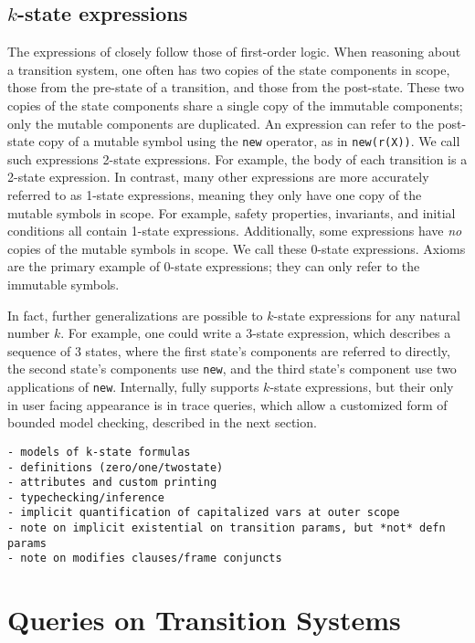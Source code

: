\subsection{$k$-state expressions}

The expressions of \mypyvy closely follow those of first-order logic.
When reasoning about a transition system,
  one often has two copies of the state components in scope,
  those from the pre-state of a transition, and those from the post-state.
These two copies of the state components share a single copy of the immutable components;
  only the mutable components are duplicated.
An expression can refer to the post-state copy of a mutable symbol
  using the \lstinline[language=mypyvy]{new} operator,
  as in \lstinline[language=mypyvy]{new(r(X))}.
We call such expressions 2-state expressions.
For example, the body of each transition is a 2-state expression.
In contrast, many other expressions are
  more accurately referred to as 1-state expressions,
  meaning they only have one copy of the mutable symbols in scope.
For example, safety properties, invariants,
  and initial conditions all contain 1-state expressions.
Additionally, some expressions have \emph{no} copies of the mutable symbols in scope.
We call these 0-state expressions.
Axioms are the primary example of 0-state expressions;
  they can only refer to the immutable symbols.

In fact, further generalizations are possible
  to $k$-state expressions for any natural number $k$.
For example, one could write a 3-state expression,
  which describes a sequence of 3 states,
  where the first state's components are referred to directly,
  the second state's components use \lstinline[language=mypyvy]{new},
  and the third state's component use two applications of \lstinline[language=mypyvy]{new}.
Internally, \mypyvy fully supports $k$-state expressions,
  but their only in user facing appearance is in trace queries,
  which allow a customized form of bounded model checking,
  described in the next section.

\begin{verbatim}
- models of k-state formulas
- definitions (zero/one/twostate)
- attributes and custom printing
- typechecking/inference
- implicit quantification of capitalized vars at outer scope
- note on implicit existential on transition params, but *not* defn params
- note on modifies clauses/frame conjuncts
\end{verbatim}

\section{Queries on Transition Systems}\label{sec:mypyvy-queries}

